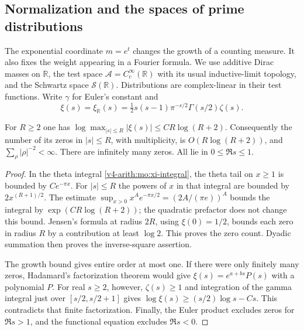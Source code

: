 \subsection{Normalization and the spaces of prime distributions}
\label{v4-arith:pm:chapter}

The exponential coordinate $m=e^t$ changes the growth of a counting
measure. It also fixes the weight appearing in a Fourier formula.
We use additive Dirac masses on $\mathbb R$, the test space
$\mathscr A=C_c^\infty(\mathbb R)$ with its usual inductive-limit
topology, and the Schwartz space $\mathscr S(\mathbb R)$.
Distributions are complex-linear in their test functions.
Write $\gamma$ for Euler's constant and
\[
 \xi(s)=\xi_{\mathbb R}(s)
   =\tfrac12s(s-1)\pi^{-s/2}\Gamma(s/2)\zeta(s).
\]

\begin{lemma}
\label{v4-arith:pm:zero-count}
For $R\geq2$ one has
$\log\max_{|s|\leq R}|\xi(s)|\leq CR\log(R+2)$.
Consequently the number of its zeros in $|s|\leq R$, with
multiplicity, is $O(R\log(R+2))$, and
$\sum_\rho|\rho|^{-2}<\infty$.
There are infinitely many zeros. All lie in $0\leq\Re s\leq1$.
\end{lemma}
\begin{proof}
In the theta integral \eqref{v4-arith:mo:xi-integral}, the theta
tail on $x\geq1$ is bounded by $C e^{-\pi x}$. For $|s|\leq R$
the powers of $x$ in that integral are bounded by $2x^{(R+1)/2}$.
The estimate
$\sup_{x>0}x^A e^{-\pi x/2}=(2A/(\pi e))^A$
bounds the integral by $\exp(CR\log(R+2))$; the quadratic
prefactor does not change this bound. Jensen's formula at radius
$2R$, using $\xi(0)=1/2$, bounds each zero in radius $R$ by a
contribution at least $\log2$. This proves the zero count.
Dyadic summation then proves the inverse-square assertion.

The growth bound gives entire order at most one. If there were
only finitely many zeros, Hadamard's factorization theorem would
give $\xi(s)=e^{a+bs}P(s)$ with a polynomial $P$.
For real $s\geq2$, however, $\zeta(s)\geq1$ and integration of
the gamma integral just over $[s/2,s/2+1]$ gives
$\log\xi(s)\geq(s/2)\log s-Cs$. This contradicts that finite
factorization. Finally, the Euler product excludes zeros for
$\Re s>1$, and the functional equation excludes $\Re s<0$.
\end{proof}

